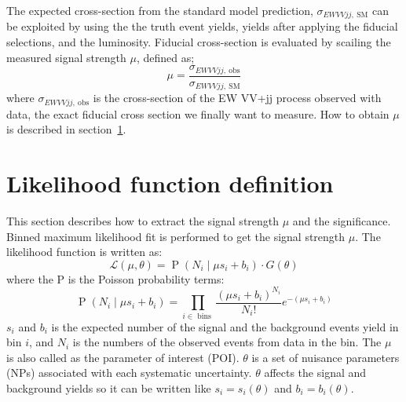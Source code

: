 The expected cross-section from the standard model prediction, $\sigma_{EW VVjj \mathrm{, \ SM}}$ can be exploited by using the the truth event yields, yields after applying the fiducial selections, and the luminosity.
Fiducial cross-section is evaluated by scailing the measured signal strength $\mu$, defined as;
\begin{equation}
\mu = \frac{\sigma_{EW VVjj \mathrm{, \ obs}}}{\sigma_{EW VVjj \mathrm{, \ SM}}}
\end{equation}
where $\sigma_{EW VVjj \mathrm{, \ obs}}$ is the cross-section of the EW VV+jj process observed with data, the exact fiducial cross section we finally want to measure.
How to obtain $\mu$ is described in section~\ref{sec:likelihood}.

\section{Likelihood function definition}
\label{sec:likelihood}
This section describes how to extract the signal strength $\mu$ and the significance.
Binned maximum likelihood fit is performed to get the signal strength $\mu$. 
The likelihood function is written as:
\begin{equation}
\label{eq:poisson}
\mathcal{L}(\mu, \theta) = \operatorname{P}\left(N_{i} \mid \mu s_{i}+b_{i}\right) \cdot G(\theta) 
\end{equation}
where the P is the Poisson probability terms:
\begin{equation}
\operatorname{P}\left(N_{i} \mid \mu s_{i}+b_{i}\right) = \prod_{i \in \text { bins }} \frac{\left(\mu s_{i}+b_{i}\right)^{N_{i}}}{N_{i} !} e^{-\left(\mu s_{i}+b_{i}\right)} 
\end{equation}
$s_i$ and $b_i$ is the expected number of the signal and the background events yield in bin $i$, and $N_i$ is the numbers of the observed events from data in the bin. 
The $\mu$ is also called as the parameter of interest (POI). $\theta$ is a set of nuisance parameters (NPs) associated with each systematic uncertainty. $\theta$ affects the signal and background yields so it can be written like $s_{i}=s_{i}(\theta)$ and $b_{i}=b_{i}(\theta)$. 
